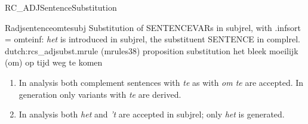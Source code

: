 \begin{mruleclass}{RC\_ADJSentenceSubstitution}
\begin{members}
\begin{member}
\end{member}
\begin{member}
 Radjsentenceomtesubj
  Substitution of SENTENCEVARs in subjrel,
with .infsort = omteinf: {\em het} is introduced
in subjrel, the substituent SENTENCE in complrel.
\file dutch:rcs\_adjsubst.mrule (mrules38)
\semantics proposition substitution
\example\mbox{}
het bleek moeilijk (om) op tijd weg te komen
\remarks\mbox{}
\begin{enumerate} 
  \item
In analysis both complement 
sentences with {\em te} as with {\em om te} are accepted.
In generation only variants with {\em te} are derived.
  \item
In analysis both {\em het } and {\em 't } are accepted in subjrel; 
only {\em het} is 
generated.
\end{enumerate}
\end{member}
\end{members}
\end{mruleclass}

